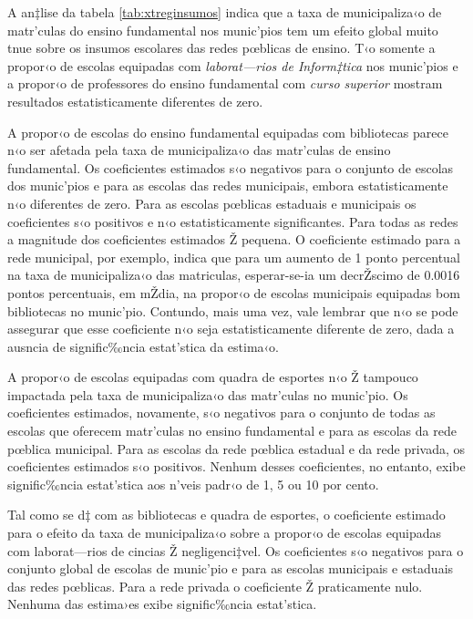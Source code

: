 \documentclass[a4paper, 12pt]{article}
\begin{document}
A an‡lise da tabela \ref{tab:xtreginsumos} indica que a taxa de municipaliza‹o de matr’culas do ensino fundamental nos munic’pios tem um efeito global muito tnue sobre os insumos escolares das redes pœblicas de ensino. T‹o somente a propor‹o de escolas equipadas com \emph{laborat—rios de Inform‡tica} nos munic’pios e a propor‹o de professores do ensino fundamental com \emph{curso superior} mostram resultados estatisticamente diferentes de zero.

A propor‹o de escolas do ensino fundamental equipadas com bibliotecas parece n‹o ser afetada pela taxa de municipaliza‹o das matr’culas de ensino fundamental. Os coeficientes estimados s‹o negativos para o conjunto de escolas dos munic’pios e para as escolas das redes municipais, embora estatisticamente n‹o diferentes de zero. Para as escolas pœblicas estaduais e municipais os coeficientes s‹o positivos e n‹o estatisticamente  significantes. Para todas as redes a magnitude dos coeficientes estimados Ž pequena. O coeficiente estimado para a rede municipal, por exemplo, indica que para um aumento de 1 ponto percentual na taxa de municipaliza‹o das matriculas, esperar-se-ia um decrŽscimo de 0.0016 pontos percentuais, em mŽdia,  na propor‹o de escolas municipais equipadas bom bibliotecas no munic’pio. Contundo, mais uma vez, vale lembrar que n‹o se pode assegurar que esse coeficiente n‹o seja estatisticamente diferente de zero, dada a ausncia de signific‰ncia estat’stica da estima‹o. 

A propor‹o de escolas equipadas com quadra de esportes n‹o Ž tampouco impactada pela taxa de municipaliza‹o das matr’culas no munic’pio. Os coeficientes estimados, novamente, s‹o negativos para o conjunto de todas as escolas que oferecem matr’culas no ensino fundamental e para as escolas da rede pœblica municipal. Para as escolas da rede pœblica estadual e da rede privada, os coeficientes estimados s‹o positivos. Nenhum desses coeficientes, no entanto, exibe signific‰ncia estat’stica aos n’veis padr‹o de 1, 5 ou 10 por cento. 

Tal como se d‡ com as bibliotecas e quadra de esportes, o coeficiente estimado para o efeito da taxa de municipaliza‹o sobre a propor‹o de escolas equipadas com laborat—rios de cincias Ž negligenci‡vel. Os coeficientes s‹o negativos para o conjunto global de escolas de munic’pio e para as escolas municipais e estaduais das redes pœblicas. Para a rede privada o coeficiente Ž praticamente nulo. Nenhuma das estima›es exibe signific‰ncia estat’stica. 
\end{document}
